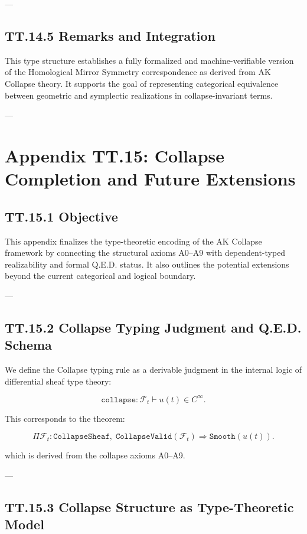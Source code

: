 \documentclass[11pt]{article}
\begin{document}
{---

\subsection*{TT.14.5 Remarks and Integration}

This type structure establishes a fully formalized and machine-verifiable version  
of the Homological Mirror Symmetry correspondence as derived from AK Collapse theory.  
It supports the goal of representing categorical equivalence  
between geometric and symplectic realizations in collapse-invariant terms.

---

\section*{Appendix TT.15: Collapse Completion and Future Extensions}

\subsection*{TT.15.1 Objective}

This appendix finalizes the type-theoretic encoding of the AK Collapse framework by connecting the structural axioms A0–A9  
with dependent-typed realizability and formal Q.E.D. status.  
It also outlines the potential extensions beyond the current categorical and logical boundary.

---

\subsection*{TT.15.2 Collapse Typing Judgment and Q.E.D. Schema}

We define the Collapse typing rule as a derivable judgment in the internal logic of differential sheaf type theory:

\[
\texttt{collapse} : \mathcal{F}_t \vdash u(t) \in C^\infty.
\]

This corresponds to the theorem:

\[
\Pi \mathcal{F}_t : \texttt{CollapseSheaf},\;
\texttt{CollapseValid}(\mathcal{F}_t)
\Rightarrow
\texttt{Smooth}(u(t)).
\]

which is derived from the collapse axioms A0–A9.

---

\subsection*{TT.15.3 Collapse Structure as Type-Theoretic Model}

}
\end{document}
